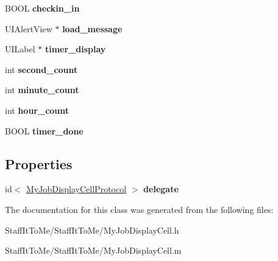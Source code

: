 \begin{DoxyCompactItemize}
\item 
\hypertarget{interface_my_job_display_cell_a81c69e4e692d81c61496b09857b8f071}{
\-B\-O\-O\-L {\bfseries checkin\-\_\-in}}
\label{interface_my_job_display_cell_a81c69e4e692d81c61496b09857b8f071}

\item 
\hypertarget{interface_my_job_display_cell_a701aeeee6b4f2625a801c6cdd24ecbe5}{
\-U\-I\-Alert\-View $\ast$ {\bfseries load\-\_\-message}}
\label{interface_my_job_display_cell_a701aeeee6b4f2625a801c6cdd24ecbe5}

\item 
\hypertarget{interface_my_job_display_cell_ad3c42f7276d732e58a4a4c19d050087f}{
\-U\-I\-Label $\ast$ {\bfseries timer\-\_\-display}}
\label{interface_my_job_display_cell_ad3c42f7276d732e58a4a4c19d050087f}

\item 
\hypertarget{interface_my_job_display_cell_a48418dfe8ad85419b733b458e8dbd3db}{
int {\bfseries second\-\_\-count}}
\label{interface_my_job_display_cell_a48418dfe8ad85419b733b458e8dbd3db}

\item 
\hypertarget{interface_my_job_display_cell_ad0f35832c7925b94e3a0d14dcc5da34a}{
int {\bfseries minute\-\_\-count}}
\label{interface_my_job_display_cell_ad0f35832c7925b94e3a0d14dcc5da34a}

\item 
\hypertarget{interface_my_job_display_cell_ac2c0263452a53a3ae538248658819a9a}{
int {\bfseries hour\-\_\-count}}
\label{interface_my_job_display_cell_ac2c0263452a53a3ae538248658819a9a}

\item 
\hypertarget{interface_my_job_display_cell_a0c2c5b185d078ce6645302d6dbf49641}{
\-B\-O\-O\-L {\bfseries timer\-\_\-done}}
\label{interface_my_job_display_cell_a0c2c5b185d078ce6645302d6dbf49641}

\end{DoxyCompactItemize}
\subsection*{\-Properties}
\begin{DoxyCompactItemize}
\item 
\hypertarget{interface_my_job_display_cell_a66326bbba3061f29fcfd26d9ab47a3f3}{
id$<$ \hyperlink{protocol_my_job_display_cell_protocol-p}{\-My\-Job\-Display\-Cell\-Protocol} $>$ {\bfseries delegate}}
\label{interface_my_job_display_cell_a66326bbba3061f29fcfd26d9ab47a3f3}

\end{DoxyCompactItemize}


\-The documentation for this class was generated from the following files\-:\begin{DoxyCompactItemize}
\item 
\-Staff\-It\-To\-Me/\-Staff\-It\-To\-Me/\-My\-Job\-Display\-Cell.\-h\item 
\-Staff\-It\-To\-Me/\-Staff\-It\-To\-Me/\-My\-Job\-Display\-Cell.\-m\end{DoxyCompactItemize}
